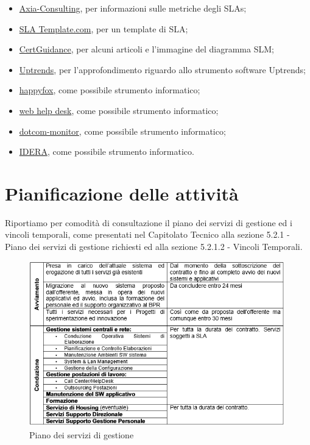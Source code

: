 \begin{itemize}
    \item \href{http://www.axia-consulting.co.uk/html/sla_metrics.html}{Axia-Consulting}, per informazioni sulle metriche degli SLAs;
    \item \href{http://www.slatemplate.com/}{ SLA Template.com}, per un template di SLA;
    \item \href{https://www.certguidance.com/topics/itil-foundation/}{CertGuidance}, per alcuni articoli e l'immagine del diagramma SLM;
    \item \href{https://www.uptrends.com/}{Uptrends}, per l'approfondimento riguardo allo strumento software Uptrends;
    \item \href{https://www.happyfox.com/}{happyfox}, come possibile strumento informatico;
    \item \href{https://www.webhelpdesk.com/help-desk-software/sla-management-monitoring-reports}{web help desk}, come possibile strumento informatico;
    \item \href{https://www.dotcom-monitor.com/web-performance-reports/sla-management/}{dotcom-monitor}, come possibile strumento informatico;
    \item \href{https://www.idera.com/it-infrastructure-management-and-monitoring/sla-management-tools}{IDERA}, come possibile strumento informatico.
\end{itemize}

\section{Pianificazione delle attività}

Riportiamo per comodità di consultazione il piano dei servizi di gestione ed i vincoli temporali, come presentati nel Capitolato Tecnico alla sezione 5.2.1 - Piano dei servizi di gestione richiesti ed alla sezione 5.2.1.2 - Vincoli Temporali.

\begin{figure}[H]
\centering
\includegraphics[width=30em]{immagini/sla/planning.png}
\caption{Piano dei servizi di gestione}
\end{figure}

